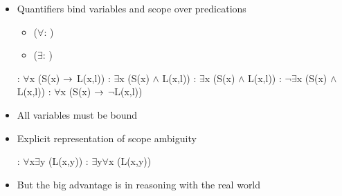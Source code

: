 \documentclass[headrule,footrule]{foils}
\begin{document}
\begin{itemize}
  \item Quantifiers bind variables and scope over predications
    \begin{itemize}
    \item {} ($\forall$: )
    \item {} ($\exists$: )
    \end{itemize}
    \begin{exe}
      \ex {}: $\forall$x (S(x)  $\rightarrow$ L(x,l))
      \ex {}: $\exists$x (S(x)  $\wedge$ L(x,l))
      \ex {}: $\exists$x (S(x)  $\wedge$ L(x,l))
      \ex {}: $\neg\exists$x (S(x)  $\wedge$ L(x,l))
      \ex {}: $\forall$x (S(x)  $\rightarrow$ $\neg$L(x,l))
    \end{exe}
  \item All variables must be bound
\end{itemize}

\MyLogo{}

\begin{itemize}
\item Explicit representation of scope ambiguity
  \begin{exe}
    \ex {}
    \begin{xlist}
          \ex {}:  $\forall$x$\exists$y (L(x,y))
          \ex {}: 
          $\exists$y$\forall$x (L(x,y))
    \end{xlist}
  \end{exe}
\item But the big advantage is in reasoning with the real world
   \\ 
\end{itemize}


\end{document}
